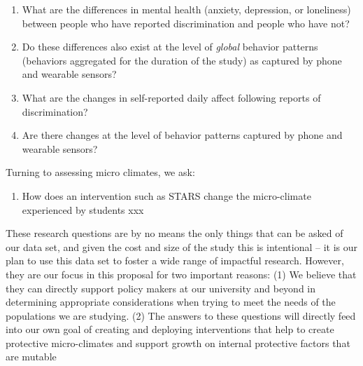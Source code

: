 \begin{enumerate}[start=1,label={\bfseries RQ\arabic*}, leftmargin=1cm]
    \item \label{itm:rq-long-outcome} What are the differences in mental health (\eg anxiety, depression, or loneliness) between people who have reported discrimination and people who have not?
    \item \label{itm:rq-long-behavior} Do these differences also exist at the level of \textit{global} behavior patterns (\ie behaviors aggregated for the duration of the study) as captured by phone and wearable sensors?
    \item \label{itm:rq-short-outcome} What are the changes in self-reported daily affect following reports of discrimination? %
    \item \label{itm:rq-short-behavior} Are there changes at the level of behavior patterns captured by phone and wearable sensors?
\end{enumerate}

\noindent Turning to assessing micro climates, we ask:

\begin{enumerate}[start=3,label={\bfseries RQ\arabic*}, leftmargin=1cm]
   \item \label{itm:intervention1} How does an intervention such as STARS change the micro-climate experienced by students xxx 
\end{enumerate}

\noindent
These research questions are by no means the only things that can be asked of our data set, and given the cost and size of the study this is intentional -- it is our plan to use this data set to foster a wide range of impactful research. However, they are our focus in this proposal for two important reasons:
(1) We believe that they can directly support policy makers at our university and beyond in determining appropriate considerations when trying to meet the needs of the populations we are studying. 
(2) The answers to these questions will directly feed into our own goal of creating and deploying interventions that help to create protective micro-climates and support growth on internal protective factors that are mutable
 
